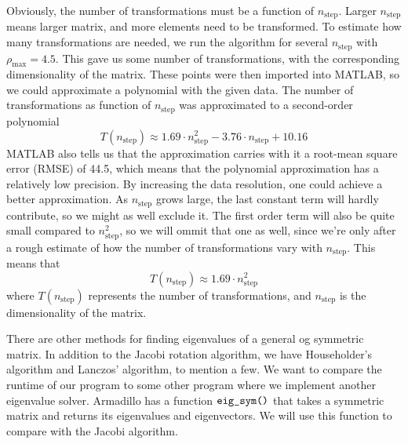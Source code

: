 Obviously, the number of transformations must be a function of $n_{\mathrm{step}}$. Larger
$n_{\mathrm{step}}$ means larger matrix, and more elements need to be transformed.
To estimate how many transformations are needed, we run the algorithm for several
$n_{\mathrm{step}}$ with $\rho_{\mathrm{max}} = 4.5$. This gave us some number of transformations,
with the corresponding dimensionality of the matrix. These points were then imported into 
MATLAB, so we could approximate a polynomial with the given data. The number of transformations as function of $n_{\mathrm{step}}$ was approximated to a second-order polynomial
%
$$ T(n_{\mathrm{step}}) \approx 1.69 \cdot n_{\mathrm{step}}^2 - 3.76 \cdot n_{\mathrm{step}}
+ 10.16 $$
%
MATLAB also tells us that the approximation carries with it a root-mean square error
(RMSE) of 44.5, which means that the polynomial approximation has a relatively low
precision. By increasing the data resolution, one could achieve a better approximation.
As $n_{\mathrm{step}}$ grows large, the last constant term will hardly contribute, so we 
might as well exclude it. The first order term will also be quite small compared to
$n_{\mathrm{step}}^2$, so we will ommit that one as well, since we're only after a rough 
estimate of how the number of transformations vary with $n_{\mathrm{step}}$. This means that
$$ T(n_{\mathrm{step}}) \approx 1.69 \cdot n_{\mathrm{step}}^2 $$
where $T(n_{\mathrm{step}})$ represents the number of transformations, and $n_{\mathrm{step}}$
is the dimensionality of the matrix. 

There are other methods for finding eigenvalues of a general og symmetric matrix. In
addition to the Jacobi rotation algorithm, we have Householder's algorithm and Lanczos'
algorithm, to mention a few. We want to compare the runtime of our program to some
other program where we implement another eigenvalue solver. Armadillo has a function 
$\verb|eig_sym()|$ that takes a symmetric
matrix and returns its eigenvalues and eigenvectors. We will use this function to compare
with the Jacobi algorithm. 

